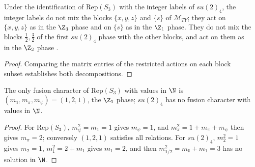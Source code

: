 \begin{lemma}%
    \label{thm:mposym_reps3_in_su24}
    \leanok
    Under the identification of $\mathrm{Rep}(S_3)$ with the integer labels of
    $su(2)_4$, the integer labels do not mix the blocks $\{x,y,z\}$ and
    $\{s\}$ of $\mathcal M_{TY}$; they act on $\{x,y,z\}$ as in the $\Z_3$
    phase and on $\{s\}$ as in the $\Z_1$ phase. They do not mix the blocks
    $\tfrac12,\tfrac32$ of the first $su(2)_4$ phase with the other blocks,
    and act on them as in the $\Z_2$ phase
    \cite[Section~6]{GarreRubio2023MPOSym}.
\end{lemma}

\begin{proof}
    \leanok
    Comparing the matrix entries of the restricted actions on each block
    subset establishes both decompositions.
\end{proof}

\begin{lemma}%
    \label{thm:mposym_su24_reps3_one_block}
    \leanok
    The only fusion character of $\mathrm{Rep}(S_3)$ with values in $\N$ is
    $(m_1,m_\pi,m_\psi)=(1,2,1)$, the $\Z_1$ phase; $su(2)_4$ has no fusion
    character with values in $\N$.
\end{lemma}

\begin{proof}
    \leanok
    For $\mathrm{Rep}(S_3)$, $m_\psi^2=m_1=1$ gives $m_\psi=1$, and
    $m_\pi^2=1+m_\pi+m_\psi$ then gives $m_\pi=2$; conversely $(1,2,1)$
    satisfies all relations. For $su(2)_4$, $m_2^2=1$ gives $m_2=1$,
    $m_1^2=2+m_1$ gives $m_1=2$, and then $m_{1/2}^2=m_0+m_1=3$ has no
    solution in $\N$.
\end{proof}

